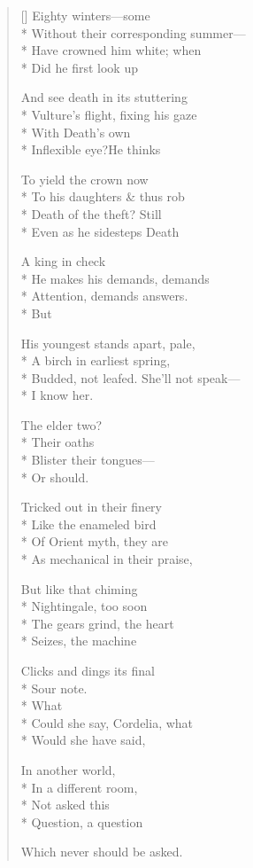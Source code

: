 \label{ch:lear_ag}
\begin{verse}[\versewidth]
 Eighty winters---some\\*
Without their corresponding summer---\\*
Have crowned him white; when\\*
Did he first look up

And see death in its stuttering\\*
Vulture's flight, fixing his gaze\\*
With Death's own\\*
Inflexible eye?\qquad He thinks

To yield the crown now\\*
To his daughters \& thus rob\\*
Death of the theft?   Still\\*
Even as he sidesteps Death

A king in check\\*
He makes his demands, demands\\*
Attention, demands answers.\\*
\hspace*{5\vgap} But

His youngest stands apart, pale,\\*
A birch in earliest spring,\\*
Budded, not leafed. She'll not speak---\\*
I know her.

\hspace*{3\vgap} The elder two?\\*
Their oaths\\*
Blister their tongues---\\*
Or should.

Tricked out in their finery\\*
Like the enameled bird\\*
Of Orient myth, they are\\*
As mechanical in their praise,

But like that chiming\\*
Nightingale, too soon\\*
The gears grind, the heart\\*
Seizes, the machine

Clicks and dings its final\\*
Sour note.\\*
\hspace*{3\vgap} What\\*
Could she say, Cordelia, what\\*
Would she have said,

In another world,\\*
In a different room,\\*
Not asked this\\*
Question, a question

Which never should be asked.
\end{verse}
